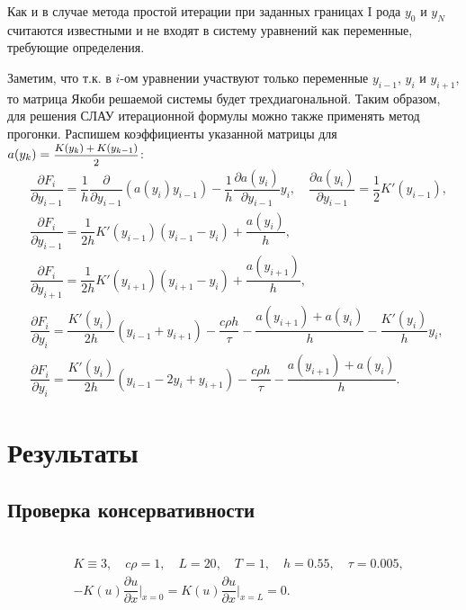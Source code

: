 \documentclass[12pt, a4paper]{article}
\begin{document}
\begin{enumerate}
		Как и в случае метода простой итерации при заданных границах I рода $y_0$ и $y_N$ считаются известными и не входят в систему уравнений как переменные, требующие определения.
		
		Заметим, что т.к. в $i$-ом уравнении участвуют только переменные $y_{i-1}$, $y_i$ и $y_{i+1}$, то матрица Якоби решаемой системы будет трехдиагональной. Таким образом, для решения СЛАУ итерационной формулы можно также применять метод прогонки. Распишем коэффициенты указанной матрицы для $a(y_k) \brop= \sfrac{K(y_k) + K(y_{k-1})}2$:
		\begin{eqnarray*}
			& \dfrac{\partial F_i}{\partial y_{i-1}} = \dfrac1h \dfrac{\partial}{\partial y_{i-1}} (a(y_i) y_{i-1}) - \dfrac1h \dfrac{\partial a(y_i)}{\partial y_{i-1}} y_i, \quad \dfrac{\partial a(y_i)}{\partial y_{i-1}} = \dfrac12 K'(y_{i-1}),\\
			& \dfrac{\partial F_i}{\partial y_{i-1}} = \dfrac1{2h} K'(y_{i-1}) (y_{i-1} - y_i) + \dfrac{a(y_i)}h, \\
			& \dfrac{\partial F_i}{\partial y_{i+1}} = \dfrac1{2h} K'(y_{i+1}) (y_{i+1} - y_i) + \dfrac{a(y_{i+1})}h,\\
			& \dfrac{\partial F_i}{\partial y_i} = \dfrac{K'(y_i)}{2h} (y_{i-1} + y_{i+1}) - \dfrac{c\rho h}\tau - \dfrac{a(y_{i+1}) + a(y_i)}h - \dfrac{K'(y_i)}h y_i,\\
			& \dfrac{\partial F_i}{\partial y_i} = \dfrac{K'(y_i)}{2h} (y_{i-1} -2y_i + y_{i+1}) - \dfrac{c\rho h}\tau - \dfrac{a(y_{i+1}) + a(y_i)}h.
		\end{eqnarray*}
		
	\end{enumerate}
	\newpage
	\section{Результаты}
	
	\subsection{Проверка консервативности}
	
	\hphantom{1}\\[-2.5cm]
	
	\begin{eqnarray*}
		& K \equiv 3, \quad c\rho = 1, \quad L = 20, \quad T = 1, \quad h =  0.55, \quad \tau = 0.005,\\
		& -K(u) \dfrac{\partial u}{\partial x}\Bigg|_{x=0} = K(u) \dfrac{\partial u}{\partial x}\Bigg|_{x=L} = 0.
	\end{eqnarray*}
	
\end{document}

